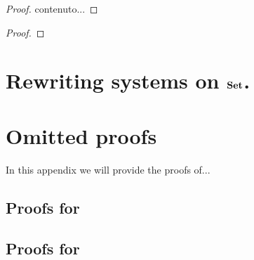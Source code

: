 \documentclass[a4paper,UKenglish,cleveref,pdftex, thm-restate,numberwithinsect]{lipics}
\def\Set{\textbf {\textup{Set}}}
\begin{document}
\begin{definition}
\end{definition}

\begin{example}
\end{example}

\begin{example}
\end{example}

\begin{proposition}
\end{proposition}
\begin{proof}
	contenuto... \qedhere 
\end{proof}
\begin{lemma}
\end{lemma}
\begin{proof}
	\qedhere 
\end{proof}

\begin{corollary}
\end{corollary}

\begin{corollary}
\end{corollary}

\section{Rewriting systems on $\Set$.}\label{app:set}


\section{Omitted proofs}
In this appendix we will provide the proofs of...
\subsection{Proofs for }
\printProofs[sec2]

\subsection{Proofs for }
\printProofs[sec3]
\end{document}
